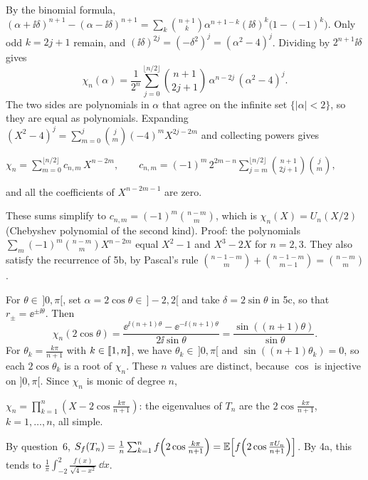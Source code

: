 \documentclass[11pt,a4paper]{article}
\begin{document}
By the binomial formula,
$(\alpha+\ii\delta)^{n+1} - (\alpha-\ii\delta)^{n+1}
 = \sum_k\binom{n+1}{k}\alpha^{n+1-k}(\ii\delta)^k\bigl(1-(-1)^k\bigr)$.
Only odd $k = 2j+1$ remain, and $(\ii\delta)^{2j} = (-\delta^2)^j = (\alpha^2-4)^j$. Dividing by
$2^{n+1}\ii\delta$ gives
\[
  \chi_n(\alpha) = \frac1{2^n}\sum_{j=0}^{\lfloor n/2\rfloor}\binom{n+1}{2j+1}\,\alpha^{n-2j}\,(\alpha^2-4)^j .
\]
The two sides are polynomials in $\alpha$ that agree on the infinite set
$\{|\alpha|<2\}$, so they are equal as polynomials. Expanding
$(X^2-4)^j = \sum_{m=0}^{j}\binom jm(-4)^m X^{2j-2m}$ and collecting powers gives
\begin{result}
$\displaystyle \chi_n = \sum_{m=0}^{\lfloor n/2\rfloor} c_{n,m}\,X^{n-2m},\qquad
 c_{n,m} = (-1)^m\,2^{2m-n}\sum_{j=m}^{\lfloor n/2\rfloor}\binom{n+1}{2j+1}\binom jm ,$
\end{result}
and all the coefficients of $X^{n-2m-1}$ are zero.
\begin{remark}
These sums simplify to $c_{n,m} = (-1)^m\binom{n-m}{m}$, which is
$\chi_n(X) = U_n(X/2)$ (Chebyshev polynomial of the second kind). Proof: the polynomials
$\sum_m(-1)^m\binom{n-m}{m}X^{n-2m}$ equal $X^2-1$ and $X^3-2X$ for $n = 2, 3$. They also
satisfy the recurrence of 5b, by Pascal's rule
$\binom{n-1-m}{m} + \binom{n-1-m}{m-1} = \binom{n-m}{m}$.
\end{remark}

For $\theta\in\,]0,\pi[$, set $\alpha = 2\cos\theta \in \,]-2,2[$ and take
$\delta = 2\sin\theta$ in 5c, so that $r_\pm = \ee^{\pm\ii\theta}$. Then
\[
  \chi_n(2\cos\theta) = \frac{\ee^{\ii(n+1)\theta} - \ee^{-\ii(n+1)\theta}}{2\ii\sin\theta}
  = \frac{\sin((n+1)\theta)}{\sin\theta}.
\]
For $\theta_k = \frac{k\pi}{n+1}$ with $k\in[\![1,n]\!]$, we have $\theta_k\in\,]0,\pi[$ and
$\sin((n+1)\theta_k) = 0$, so each $2\cos\theta_k$ is a root of $\chi_n$. These $n$ values are
distinct, because $\cos$ is injective on $]0,\pi[$. Since $\chi_n$ is monic of degree $n$,
\begin{result}
$\chi_n = \prod_{k=1}^n\left(X - 2\cos\frac{k\pi}{n+1}\right)$: the eigenvalues of $T_n$ are
the $2\cos\frac{k\pi}{n+1}$, $k = 1,\dots,n$, all simple.
\end{result}

By question~6,
$S_f(T_n) = \frac1n\sum_{k=1}^n f\!\left(2\cos\frac{k\pi}{n+1}\right)
 = \mathbb{E}\!\left[f\!\left(2\cos\frac{\pi U_n}{n+1}\right)\right]$. By 4a, this tends to
$\frac1\pi\int_{-2}^2\frac{f(x)}{\sqrt{4-x^2}}\,\dd x$.
\end{document}
